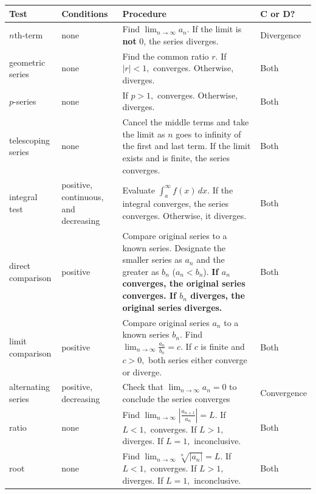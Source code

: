 \documentclass[letterpaper, 12pt]{article}
\begin{document}
\begin{table}[H]
\begin{tabular}{|p{6em}|p{8em}|p{20em}|p{6em}|}
\hline
\textbf{Test} & \textbf{Conditions} & \textbf{Procedure} & \textbf{C or D?} \\
\hline
$n$th-term & none & Find $\displaystyle \lim_{n \to \infty} a_n.$ If the limit is \textbf{not} 0, the series diverges.  & Divergence \\
\hline
geometric series & none & Find the common ratio $r.$ If $|r| < 1,$ converges. Otherwise, diverges. & Both \\
\hline
$p$-series & none & If $p > 1,$ converges. Otherwise, diverges. & Both \\
\hline
telescoping series & none & Cancel the middle terms and take the limit as $n$ goes to infinity of the first and last term. If the limit exists and is finite, the series converges. & Both \\
\hline
integral test & positive, continuous, and decreasing & Evaluate $ \int_a^\infty f(x) \, dx.$ If the integral converges, the series converges. Otherwise, it diverges. & Both \\
\hline
direct comparison & positive & Compare original series to a known series. Designate the smaller series as $a_n$ and the greater as $b_n$ ($a_n < b_n$). \textbf{If $a_n$ converges, the original series converges. If $b_n$ diverges, the original series diverges.} & Both \\
\hline
limit comparison & positive & Compare original series $a_n$ to a known series $b_n$. Find $\displaystyle \lim_{n \to \infty} \frac{a_n}{b_n} = c.$ If $c$ is finite and $c > 0,$ both series either converge or diverge. & Both \\
\hline
alternating series & positive, decreasing & Check that $\displaystyle \lim_{n \to \infty} a_n = 0$ to conclude the series converges & Convergence \\
\hline
ratio & none & Find $\displaystyle \lim_{n \to \infty} \left| \frac{a_{n+1}}{a_n} \right| = L.$ If $L < 1,$ converges. If $L > 1,$ diverges. If $L = 1,$ inconclusive. & Both \\
\hline
root & none & Find $\displaystyle \lim_{n \to \infty} \sqrt[n]{|a_n|} = L.$ If $L < 1,$ converges. If $L > 1,$ diverges. If $L = 1,$ inconclusive. & Both \\
\hline
\end{tabular}
\end{table}

\newpage
\end{document}
